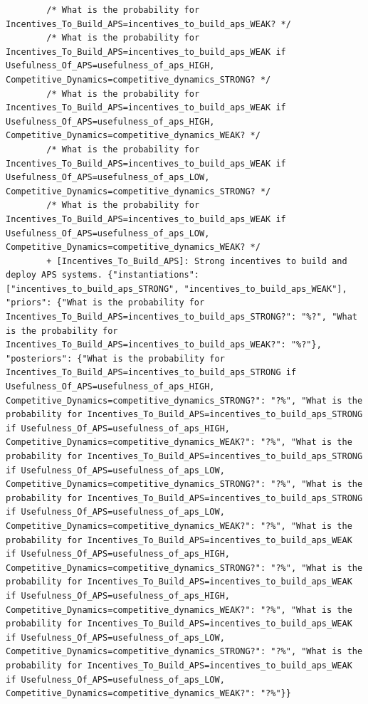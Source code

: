 \documentclass[
  11pt,
  letterpaper,
]{book}
\begin{document}
\begin{verbatim}
        /* What is the probability for Incentives_To_Build_APS=incentives_to_build_aps_WEAK? */
        /* What is the probability for Incentives_To_Build_APS=incentives_to_build_aps_WEAK if Usefulness_Of_APS=usefulness_of_aps_HIGH, Competitive_Dynamics=competitive_dynamics_STRONG? */
        /* What is the probability for Incentives_To_Build_APS=incentives_to_build_aps_WEAK if Usefulness_Of_APS=usefulness_of_aps_HIGH, Competitive_Dynamics=competitive_dynamics_WEAK? */
        /* What is the probability for Incentives_To_Build_APS=incentives_to_build_aps_WEAK if Usefulness_Of_APS=usefulness_of_aps_LOW, Competitive_Dynamics=competitive_dynamics_STRONG? */
        /* What is the probability for Incentives_To_Build_APS=incentives_to_build_aps_WEAK if Usefulness_Of_APS=usefulness_of_aps_LOW, Competitive_Dynamics=competitive_dynamics_WEAK? */
        + [Incentives_To_Build_APS]: Strong incentives to build and deploy APS systems. {"instantiations": ["incentives_to_build_aps_STRONG", "incentives_to_build_aps_WEAK"], "priors": {"What is the probability for Incentives_To_Build_APS=incentives_to_build_aps_STRONG?": "%?", "What is the probability for Incentives_To_Build_APS=incentives_to_build_aps_WEAK?": "%?"}, "posteriors": {"What is the probability for Incentives_To_Build_APS=incentives_to_build_aps_STRONG if Usefulness_Of_APS=usefulness_of_aps_HIGH, Competitive_Dynamics=competitive_dynamics_STRONG?": "?%", "What is the probability for Incentives_To_Build_APS=incentives_to_build_aps_STRONG if Usefulness_Of_APS=usefulness_of_aps_HIGH, Competitive_Dynamics=competitive_dynamics_WEAK?": "?%", "What is the probability for Incentives_To_Build_APS=incentives_to_build_aps_STRONG if Usefulness_Of_APS=usefulness_of_aps_LOW, Competitive_Dynamics=competitive_dynamics_STRONG?": "?%", "What is the probability for Incentives_To_Build_APS=incentives_to_build_aps_STRONG if Usefulness_Of_APS=usefulness_of_aps_LOW, Competitive_Dynamics=competitive_dynamics_WEAK?": "?%", "What is the probability for Incentives_To_Build_APS=incentives_to_build_aps_WEAK if Usefulness_Of_APS=usefulness_of_aps_HIGH, Competitive_Dynamics=competitive_dynamics_STRONG?": "?%", "What is the probability for Incentives_To_Build_APS=incentives_to_build_aps_WEAK if Usefulness_Of_APS=usefulness_of_aps_HIGH, Competitive_Dynamics=competitive_dynamics_WEAK?": "?%", "What is the probability for Incentives_To_Build_APS=incentives_to_build_aps_WEAK if Usefulness_Of_APS=usefulness_of_aps_LOW, Competitive_Dynamics=competitive_dynamics_STRONG?": "?%", "What is the probability for Incentives_To_Build_APS=incentives_to_build_aps_WEAK if Usefulness_Of_APS=usefulness_of_aps_LOW, Competitive_Dynamics=competitive_dynamics_WEAK?": "?%"}}

\end{verbatim}
\end{document}

